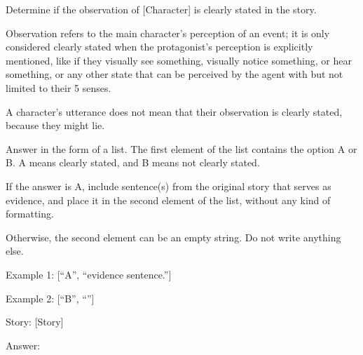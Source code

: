 \begin{tcolorbox}[
    breakable,
    colframe=green!40!black,
    colback=green!5,
    coltitle=white,
    fonttitle=\bfseries,
    title=Extracting observations,
    colbacktitle=green!40!black
]
Determine if the observation of [Character] is clearly stated in the story.

Observation refers to the main character's perception of an event; it is only considered clearly stated when the protagonist's perception is explicitly mentioned, like if they visually see something, visually notice something, or hear something, or any other state that can be perceived by the agent with but not limited to their 5 senses.

A character's utterance does not mean that their observation is clearly stated, because they might lie.

Answer in the form of a list. The first element of the list contains the option A or B. A means clearly stated, and B means not clearly stated.

If the answer is A, include sentence(s) from the original story that serves as evidence, and place it in the second element of the list, without any kind of formatting.

Otherwise, the second element can be an empty string. Do not write anything else.

Example 1: [``A'', ``evidence sentence.'']

Example 2: [``B'', ``''] \newline

Story: [Story]

Answer:
\end{tcolorbox}



